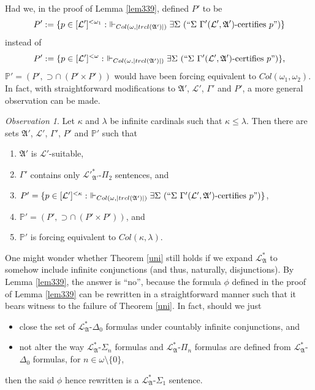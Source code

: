 \documentclass[12pt, twoside]{memoir}
\numberwithin{equation}{section}
\theoremstyle{definition}
\theoremstyle{remark}
\newtheorem{ob}[thm]{Observation}
\theoremstyle{definition}
\theoremstyle{definition}
\theoremstyle{definition}
\theoremstyle{remark}
\begin{document}
Had we, in the proof of Lemma \ref{lem339}, defined $P'$ to be
\begin{equation*}
    P' := \{p \in [\mathcal{L}']^{< \omega_1} : \ \Vdash_{Col(\omega, |trcl(\mathfrak{A}')|)} \exists \Sigma \ (``\Sigma \ \Gamma'(\mathcal{L}', \mathfrak{A}') \text{-certifies } p")\}
\end{equation*}
instead of
\begin{equation*}
    P' := \{p \in [\mathcal{L}']^{< \omega} : \ \Vdash_{Col(\omega, |trcl(\mathfrak{A}')|)} \exists \Sigma \ (``\Sigma \ \Gamma'(\mathcal{L}', \mathfrak{A}') \text{-certifies } p")\} \text{,}
\end{equation*}
$\mathbb{P}' = (P', \supset \cap \ (P' \times P'))$ would have been forcing equivalent to $Col(\omega_1, \omega_2)$. In fact, with straightforward modifications to $\mathfrak{A}'$, $\mathcal{L}'$, $\Gamma'$ and $P'$, a more general observation can be made.

\begin{ob}\label{ob259}
Let $\kappa$ and $\lambda$ be infinite cardinals such that $\kappa \leq \lambda$. Then there are sets $\mathfrak{A}'$, $\mathcal{L}'$, $\Gamma'$, $P'$ and $\mathbb{P}'$ such that
\begin{enumerate}[label=(\alph*)]
    \item $\mathfrak{A}'$ is $\mathcal{L}'$-suitable, 
    \item $\Gamma'$ contains only $\mathcal{L}'^*_{\mathfrak{A}'}$-$\Pi_2$ sentences, and
    \item $P' = \{p \in [\mathcal{L}']^{< \kappa} : \ \Vdash_{Col(\omega, |trcl(\mathfrak{A}')|)} \exists \Sigma \ (``\Sigma \ \Gamma' (\mathcal{L}', \mathfrak{A}') \text{-certifies } p")\}$,
    \item $\mathbb{P}' = (P', \supset \cap \ (P' \times P'))$, and
    \item $\mathbb{P}'$ is forcing equivalent to $Col(\kappa, \lambda)$.
\end{enumerate}
\end{ob}

One might wonder whether Theorem \ref{uni} still holds if we expand $\mathcal{L}^{*}_{\mathfrak{A}}$ to somehow include infinite conjunctions (and thus, naturally, disjunctions). By Lemma \ref{lem339}, the answer is ``no'', because the formula $\phi$ defined in the proof of Lemma \ref{lem339} can be rewritten in a straightforward manner such that it bears witness to the failure of Theorem \ref{uni}. In fact, should we just 
\begin{itemize}
    \item close the set of $\mathcal{L}^{*}_{\mathfrak{A}}$-$\Delta_0$ formulas under countably infinite conjunctions, and
    \item not alter the way $\mathcal{L}^{*}_{\mathfrak{A}}$-$\Sigma_n$ formulas and $\mathcal{L}^{*}_{\mathfrak{A}}$-$\Pi_n$ formulas are defined from $\mathcal{L}^{*}_{\mathfrak{A}}$-$\Delta_0$ formulas, for $n \in \omega \setminus \{0\}$,
\end{itemize}
then the said $\phi$ hence rewritten is a $\mathcal{L}^{*}_{\mathfrak{A}}$-$\Sigma_1$ sentence.
\end{document}
